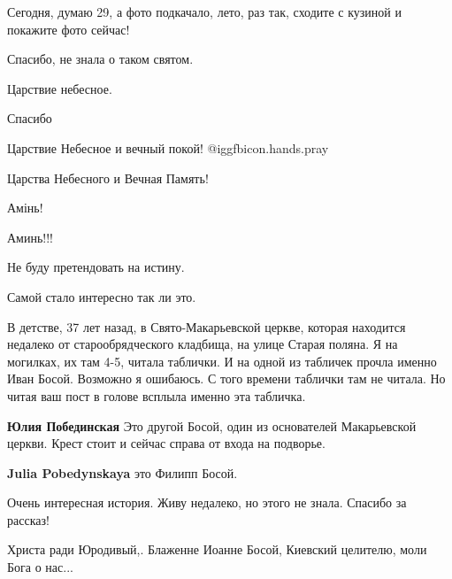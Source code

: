 \begin{itemize}
Сегодня, думаю 29, а фото подкачало, лето, раз так, сходите с кузиной и покажите фото сейчас!

Спасибо, не знала о таком святом.

Царствие небесное.

Спасибо

Царствие Небесное и вечный покой! @igg{fbicon.hands.pray} 

Царства Небесного и Вечная Память!

Амінь!


Аминь!!!


Не буду претендовать на истину.

Самой стало интересно так ли это.

В детстве, 37 лет назад, в Свято-Макарьевской церкве, которая находится
недалеко от старообрядческого кладбища, на улице Старая поляна. Я на могилках,
их там 4-5, читала таблички. И на одной из табличек прочла именно Иван Босой.
Возможно я ошибаюсь. С того времени таблички там не читала. Но читая ваш пост в
голове всплыла именно эта табличка.

\begin{itemize} %
\textbf{Юлия Побединская} Это другой Босой, один из основателей Макарьевской церкви. Крест стоит и сейчас справа от входа на подворье.

\textbf{Julia Pobedynskaya} это Филипп Босой.
\end{itemize} %

Очень интересная история. Живу недалеко, но этого не знала. Спасибо за рассказ!

Христа ради Юродивый,. Блаженне Иоанне Босой, Киевский целителю, моли Бога о нас...



\end{itemize} %
